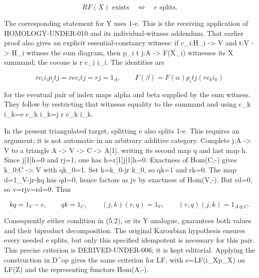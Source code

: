 \documentclass[11pt]{article}
\begin{document}
\[
 RF(X)\text{ exists}\quad\Longleftrightarrow\quad e\text{ splits}.
                                                               \tag{5.2}
\]

The corresponding statement for Y uses 1-e. This is the receiving application of HOMOLOGY-UNDER-010 and its individual-witness addendum. That earlier proof also gives an explicit essential-constancy witness:\allowbreak{} if c\_\allowbreak{}i:\allowbreak{}H\_\allowbreak{}i \allowbreak{}-> V and t:\allowbreak{}V \allowbreak{}-> H\_\allowbreak{}i witness the sum diagram,\allowbreak{} then p\_\allowbreak{}i t j:\allowbreak{}A \allowbreak{}-> F(X\_\allowbreak{}i)\allowbreak{} witnesses its X summand; the cocone is r c\_\allowbreak{}i i\_\allowbreak{}i. The identities are

\[
 r c_i i_i p_i t j=r e c_i t j=rj=1_A,
 \qquad F(\beta)=F(\alpha)p_i t j(r c_k i_k)
\]

for the eventual pair of index maps alpha and beta supplied by the sum witness. They follow by restricting that witness\textquotesingle s equality to the summand and using c\_\allowbreak{}k i\_\allowbreak{}k\allowbreak{}=e c\_\allowbreak{}k i\_\allowbreak{}k\allowbreak{}=j r c\_\allowbreak{}k i\_\allowbreak{}k.

In the present triangulated target,\allowbreak{} splitting e also splits 1-e. This requires an argument; it is not automatic in an arbitrary additive category. Complete j:\allowbreak{}A \allowbreak{}-> V to a triangle A \allowbreak{}-> V \allowbreak{}-> C \allowbreak{}-> A[1]\allowbreak{},\allowbreak{} writing its second map q and last map h. Since j[1]\allowbreak{}h\allowbreak{}=0 and rj\allowbreak{}=1,\allowbreak{} one has h\allowbreak{}=r[1]\allowbreak{}j[1]\allowbreak{}h\allowbreak{}=0. Exactness of Hom(C,\allowbreak{}-)\allowbreak{} gives k\_\allowbreak{}0:\allowbreak{}C \allowbreak{}-> V with qk\_\allowbreak{}0\allowbreak{}=1. Set k\allowbreak{}=k\_\allowbreak{}0-jr k\_\allowbreak{}0,\allowbreak{} so qk\allowbreak{}=1 and rk\allowbreak{}=0. The map d\allowbreak{}=1\_\allowbreak{}V-jr-kq has qd\allowbreak{}=0,\allowbreak{} hence factors as jv by exactness of Hom(V,\allowbreak{}-)\allowbreak{}. But rd\allowbreak{}=0,\allowbreak{} so v\allowbreak{}=rjv\allowbreak{}=rd\allowbreak{}=0. Thus

\[
 kq=1_V-e,\qquad qk=1_C,\qquad
 (j,k)(r,q)=1_V,\qquad (r,q)(j,k)=1_{A\oplus C}.          \tag{5.3}
\]

Consequently either condition in (5.2)\allowbreak{},\allowbreak{} or its Y analogue,\allowbreak{} guarantees both values and their biproduct decomposition. The original Karoubian hypothesis ensures every needed e splits,\allowbreak{} but only this specified idempotent is necessary for this pair. This precise criterion is DERIVED-UNDER-006; it is kept editorial. Applying the construction in D\textquotesingle\^{}op gives the same criterion for LF,\allowbreak{} with e\allowbreak{}=LF(i\_\allowbreak{}Xp\_\allowbreak{}X)\allowbreak{} on LF(Z)\allowbreak{} and the representing functors Hom(A,\allowbreak{}-)\allowbreak{}.
\end{document}
